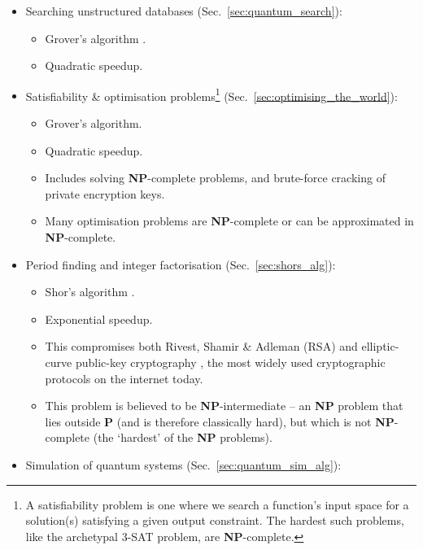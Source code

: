 \begin{itemize}
	\item Searching unstructured databases (Sec.~\ref{sec:quantum_search}):
		\begin{itemize}
		\item Grover's algorithm \cite{bib:Grover96}.
		\item Quadratic speedup.
		\end{itemize}
	\item Satisfiability \& optimisation problems\footnote{A satisfiability problem is one where we search a function's input space for a solution(s) satisfying a given output constraint. The hardest such problems, like the archetypal 3-\textsc{SAT} problem, are \textbf{NP}-complete.} (Sec.~\ref{sec:optimising_the_world}):
		\begin{itemize}
			\item Grover's algorithm.
			\item Quadratic speedup.
			\item Includes solving \textbf{NP}-complete problems, and brute-force cracking of private encryption keys.
			\item Many optimisation problems are \textbf{NP}-complete or can be approximated in \textbf{NP}-complete.
			\end{itemize}
	\item Period finding and integer factorisation (Sec.~\ref{sec:shors_alg}):
		\begin{itemize}
		\item Shor's algorithm \cite{bib:ShorFactor}.
		\item Exponential speedup.
		\item This compromises both Rivest, Shamir \& Adleman (RSA) and elliptic-curve public-key cryptography \cite{bib:RSA}, the most widely used cryptographic protocols on the internet today.
		\item This problem is believed to be \textbf{NP}-intermediate -- an \textbf{NP} problem that lies outside \textbf{P} (and is therefore classically hard), but which is not \textbf{NP}-complete (the `hardest' of the \textbf{NP} problems).
		\end{itemize}
	\item Simulation of quantum systems (Sec.~\ref{sec:quantum_sim_alg}):

\end{itemize}
